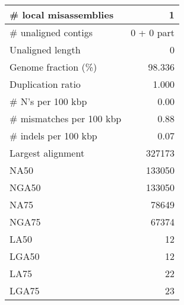 \documentclass[12pt,a4paper]{article}
\begin{document}
\begin{table}[ht]
\begin{center}
\begin{tabular}{|l*{1}{|r}|}
\# local misassemblies & 1 \\ \hline
\# unaligned contigs & 0 + 0 part \\ \hline
Unaligned length & 0 \\ \hline
Genome fraction (\%) & 98.336 \\ \hline
Duplication ratio & 1.000 \\ \hline
\# N's per 100 kbp & 0.00 \\ \hline
\# mismatches per 100 kbp & 0.88 \\ \hline
\# indels per 100 kbp & 0.07 \\ \hline
Largest alignment & 327173 \\ \hline
NA50 & 133050 \\ \hline
NGA50 & 133050 \\ \hline
NA75 & 78649 \\ \hline
NGA75 & 67374 \\ \hline
LA50 & 12 \\ \hline
LGA50 & 12 \\ \hline
LA75 & 22 \\ \hline
LGA75 & 23 \\ \hline
\end{tabular}
\end{center}
\end{table}
\end{document}
